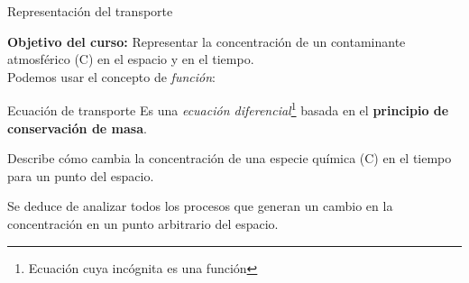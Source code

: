 \begin{frame}{Representación del transporte}

\textbf{Objetivo del curso:} Representar la concentración de un contaminante atmosférico (C) en el espacio y en el tiempo.\\[1em]

Podemos usar el concepto de \textit{función}:
\begin{center}
\end{center}
   
   
\end{frame}


 \begin{frame}{Ecuación de transporte}
\pause
Es una \textit{ecuación diferencial}\footnote{Ecuación cuya incógnita es una función} basada en el \textbf{principio de conservación de masa}.\\[2em]
\pause

Describe cómo cambia la concentración  de una especie química (C) en el tiempo para un punto del espacio.\\[2em]
\pause

Se deduce de analizar todos los procesos que generan un cambio en la concentración en un punto arbitrario del espacio.\\[2em]

\end{frame}


